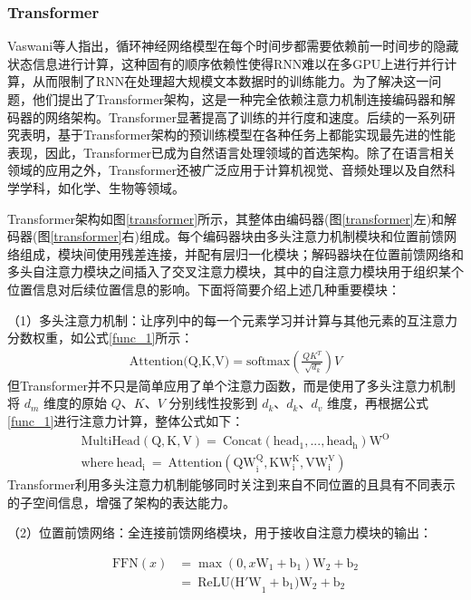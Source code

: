 \documentclass[UTF8,a4paper,12pt]{ctexart}
\numberwithin{equation}{section}
\begin{document}
\subsubsection{Transformer}
Vaswani\cite{ref14}等人指出，循环神经网络模型\cite{ref14.5}在每个时间步都需要依赖前一时间步的隐藏状态信息进行计算，这种固有的顺序依赖性使得RNN难以在多GPU上进行并行计算，从而限制了RNN在处理超大规模文本数据时的训练能力。为了解决这一问题，他们提出了Transformer架构，这是一种完全依赖注意力机制连接编码器和解码器的网络架构。Transformer显著提高了训练的并行度和速度。后续的一系列研究表明，基于Transformer架构的预训练模型在各种任务上都能实现最先进的性能表现，因此，Transformer已成为自然语言处理领域的首选架构。除了在语言相关领域的应用之外，Transformer还被广泛应用于计算机视觉、音频处理以及自然科学学科，如化学、生物等领域。\par
Transformer\cite{ref14.7}架构如图\ref{transformer}所示，其整体由编码器(图\ref{transformer}左)和解码器(图\ref{transformer}右)组成。每个编码器块由多头注意力机制模块和位置前馈网络组成，模块间使用残差连接，并配有层归一化模块；解码器块在位置前馈网络和多头自注意力模块之间插入了交叉注意力模块，其中的自注意力模块用于组织某个位置信息对后续位置信息的影响。下面将简要介绍上述几种重要模块：\par
（1）多头注意力机制：让序列中的每一个元素学习并计算与其他元素的互注意力分数权重，如公式\ref{func_1}所示：
\begin{eqnarray}
	\text{Attention(Q,K,V)} =  \text{softmax}(\frac{QK^T}{\sqrt[]{d_k}})V
	\label{func_1}
\end{eqnarray}
但Transformer并不只是简单应用了单个注意力函数，而是使用了多头注意力机制将 \(d_m\) 维度的原始 \(Q\)、\(K\)、\(V\) 分别线性投影到 \(d_k\)、\(d_k\)、\(d_v\) 维度，再根据公式\ref{func_1}进行注意力计算，整体公式如下：
\begin{eqnarray}
	\mathrm{MultiHead(Q,K,V)=~Concat(head_{1},...,head_{h})W^{O}} \\
	\mathrm{where~head_{i}~=~Attention(QW_{i}^{Q},KW_{i}^{K},VW_{i}^{V})}
	\label{func_2}
\end{eqnarray}
Transformer利用多头注意力机制能够同时关注到来自不同位置的且具有不同表示的子空间信息，增强了架构的表达能力。\par
（2）位置前馈网络：全连接前馈网络模块，用于接收自注意力模块的输出：\par
\begin{eqnarray}
	\mathrm{FFN}(x) & =\max(0,x\mathrm{W}_1+\mathrm{b}_1)\mathrm{W}_2+\mathrm{b}_2 \\
	& =\mathrm{~ReLU(H'W}_1+\mathrm{b}_1)\mathrm{W}_2+\mathrm{b}_2
	\label{func_3}
\end{eqnarray}
\end{document}

